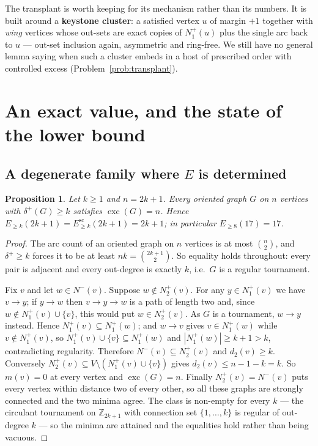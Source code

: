 \documentclass[11pt]{amsart}
\newtheorem{proposition}[theorem]{Proposition}
\theoremstyle{remark}
\newcommand{\exc}{\operatorname{exc}}
\newcommand{\Esc}{E^{\mathrm{sc}}}
\begin{document}
The transplant is worth keeping for its mechanism rather than its numbers. It
is built around a \textbf{keystone cluster}: a satisfied vertex $u$ of margin
$+1$ together with \emph{wing} vertices whose out-sets are exact copies of
$N_1^+(u)$ plus the single arc back to $u$ --- out-set inclusion again,
asymmetric and ring-free. We still have no general lemma saying when such a
cluster embeds in a host of prescribed order with controlled excess
(Problem~\ref{prob:transplant}).

\section{An exact value, and the state of the lower bound}\label{sec:lower}

\subsection{A degenerate family where $E$ is determined}

\begin{proposition}\label{prop:odd}
Let $k \ge 1$ and $n = 2k+1$. Every oriented graph $G$ on $n$ vertices with
$\delta^+(G) \ge k$ satisfies $\exc(G) = n$. Hence
$E_{\ge k}(2k+1) = \Esc_{\ge k}(2k+1) = 2k+1$; in particular
$E_{\ge 8}(17) = 17$.
\end{proposition}

\begin{proof}
The arc count of an oriented graph on $n$ vertices is at most $\binom{n}{2}$,
and $\delta^+ \ge k$ forces it to be at least $nk = \binom{2k+1}{2}$. So
equality holds throughout: every pair is adjacent and every out-degree is
exactly $k$, i.e.\ $G$ is a regular tournament.

Fix $v$ and let $w \in N^-(v)$. Suppose $w \notin N_2^+(v)$. For any
$y \in N_1^+(v)$ we have $v \to y$; if $y \to w$ then $v \to y \to w$ is a
path of length two and, since $w \notin N_1^+(v) \cup \{v\}$, this would put
$w \in N_2^+(v)$. As $G$ is a tournament, $w \to y$ instead. Hence
$N_1^+(v) \subseteq N_1^+(w)$; and $w \to v$ gives $v \in N_1^+(w)$ while
$v \notin N_1^+(v)$, so $N_1^+(v) \cup \{v\} \subseteq N_1^+(w)$ and
$|N_1^+(w)| \ge k+1 > k$, contradicting regularity. Therefore
$N^-(v) \subseteq N_2^+(v)$ and $d_2(v) \ge k$. Conversely
$N_2^+(v) \subseteq V \setminus (N_1^+(v) \cup \{v\})$ gives
$d_2(v) \le n - 1 - k = k$. So $m(v) = 0$ at every vertex and $\exc(G) = n$.
Finally $N_2^+(v) = N^-(v)$ puts every vertex within distance two of every
other, so all these graphs are strongly connected and the two minima agree. The class
is non-empty for every $k$ --- the circulant tournament on $\mathbb{Z}_{2k+1}$
with connection set $\{1, \dots, k\}$ is regular of out-degree $k$ --- so the
minima are attained and the equalities hold rather than being vacuous.
\end{proof}
\end{document}
